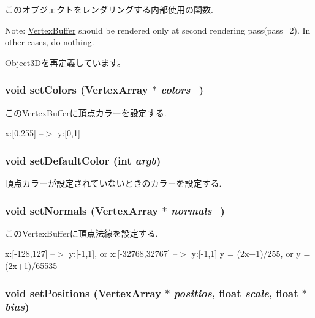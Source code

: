 このオブジェクトをレンダリングする内部使用の関数.

Note: \hyperlink{classm3g_1_1VertexBuffer}{VertexBuffer} should be rendered only at second rendering pass(pass=2). In other cases, do nothing. 

\hyperlink{classm3g_1_1Object3D_8babc8a79b78615da51161e94029eea9}{Object3D}を再定義しています。\hypertarget{classm3g_1_1VertexBuffer_e5a5933252e3ec3afa0a83698b5b3521}{
\subsubsection[{setColors}]{\setlength{\rightskip}{0pt plus 5cm}void setColors ({\bf VertexArray} $\ast$ {\em colors\_\-})}}
\label{classm3g_1_1VertexBuffer_e5a5933252e3ec3afa0a83698b5b3521}


このVertexBufferに頂点カラーを設定する.

x:\mbox{[}0,255\mbox{]} --$>$ y:\mbox{[}0,1\mbox{]} \hypertarget{classm3g_1_1VertexBuffer_57fc3a141397f1287061a204c128c1b3}{
\subsubsection[{setDefaultColor}]{\setlength{\rightskip}{0pt plus 5cm}void setDefaultColor (int {\em argb})}}
\label{classm3g_1_1VertexBuffer_57fc3a141397f1287061a204c128c1b3}


頂点カラーが設定されていないときのカラーを設定する. \hypertarget{classm3g_1_1VertexBuffer_4aabe6277538d5aa8285759dab85002a}{
\subsubsection[{setNormals}]{\setlength{\rightskip}{0pt plus 5cm}void setNormals ({\bf VertexArray} $\ast$ {\em normals\_\-})}}
\label{classm3g_1_1VertexBuffer_4aabe6277538d5aa8285759dab85002a}


このVertexBufferに頂点法線を設定する.

x:\mbox{[}-128,127\mbox{]} --$>$ y:\mbox{[}-1,1\mbox{]}, or x:\mbox{[}-32768,32767\mbox{]} --$>$ y:\mbox{[}-1,1\mbox{]} y = (2x+1)/255, or y = (2x+1)/65535 \hypertarget{classm3g_1_1VertexBuffer_527460407f488d5128bae7d0adb6da43}{
\subsubsection[{setPositions}]{\setlength{\rightskip}{0pt plus 5cm}void setPositions ({\bf VertexArray} $\ast$ {\em positios}, \/  float {\em scale}, \/  float $\ast$ {\em bias})}}
\label{classm3g_1_1VertexBuffer_527460407f488d5128bae7d0adb6da43}


